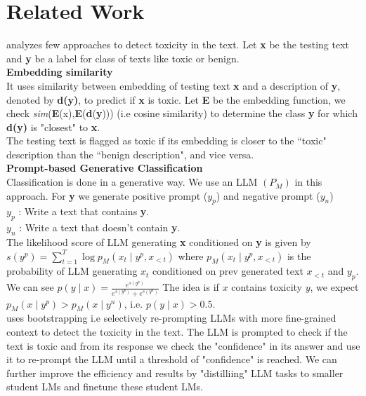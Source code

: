 \section{Related Work}
\citet{wang2022toxicity} analyzes few approaches to detect toxicity in the text. Let \textbf{x} be the testing text and \textbf{y} be a label for class of texts like toxic or benign. \\ 
\textbf{Embedding similarity}\\
It uses similarity between embedding of testing text \textbf{x} and a description of \textbf{y}, denoted by \textbf{d(y)}, to predict if \textbf{x} is toxic.  
Let \textbf{E} be the embedding function, we check \textit{sim}(\textbf{E}(x),\textbf{E}(\textbf{d}(\textbf{y}))) (i.e cosine similarity) to determine the class \textbf{y} for which \textbf{d(y)} is "closest" to \textbf{x}.\\
The testing text is flagged as toxic if its embedding is closer to the “toxic" description than the “benign description", and vice versa. \\
\noindent \textbf{Prompt-based Generative Classification}\\
Classification is done in a generative way. We use an LLM $(P_M)$ in this approach. For \textbf{y} we generate positive prompt ($y_p$) and negative prompt ($y_n$) \\
$y_p$ : Write a text that contains \textbf{y}. \\
$y_n$ : Write a text that doesn’t contain \textbf{y}. \\
The likelihood score of LLM generating \textbf{x} conditioned on \textbf{y} is given by $s\left(y^p\right)=\sum_{t=1}^T \log p_M\left(x_t \mid y^p, x_{<t}\right)$ where $p_M\left(x_t \mid y^p, x_{<t}\right)$ is the probability of LLM generating $x_t$ conditioned on prev generated text $x_{<t}$ and $y_p$.\\
We can see $p(y \mid x)=\frac{e^{s\left(y^p\right)}}{e^{s\left(y^p\right)}+e^{s\left(y^n\right)}}$
The idea is if $x$ contains toxicity $y$, we expect $p_M\left(x \mid y^p\right)>p_M\left(x \mid y^n\right)$, i.e. $p(y \mid x)>0.5$. \\

\noindent \citet{zhang2024efficient} uses bootstrapping i.e selectively re-prompting LLMs with more fine-grained context to detect the toxicity in the text. The LLM is prompted to check if the text is toxic and from its response we check the "confidence" in its answer and use it to re-prompt the LLM until a threshold of "confidence" is reached. We can further improve the efficiency and results by "distilliing" LLM tasks to smaller student LMs and finetune these student LMs.









